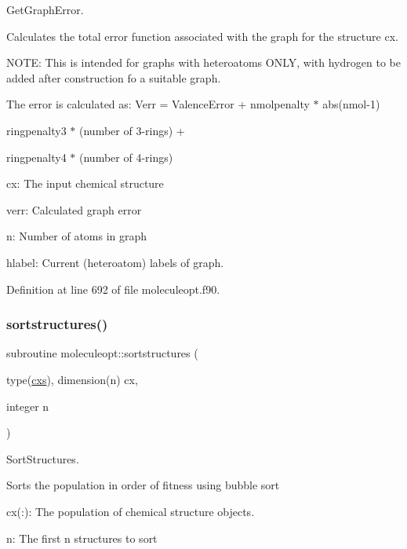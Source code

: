 Get\+Graph\+Error. 

Calculates the total error function associated with the graph for the structure cx.

N\+O\+TE\+: This is intended for graphs with heteroatoms O\+N\+LY, with hydrogen to be added after construction fo a suitable graph.

The error is calculated as\+: Verr = Valence\+Error + nmolpenalty $\ast$ abs(nmol-\/1)
\begin{DoxyItemize}
\item ringpenalty3 $\ast$ (number of 3-\/rings) +
\item ringpenalty4 $\ast$ (number of 4-\/rings)
\end{DoxyItemize}

cx\+: The input chemical structure
\begin{DoxyItemize}
\item verr\+: Calculated graph error
\item n\+: Number of atoms in graph
\item hlabel\+: Current (heteroatom) labels of graph. 
\end{DoxyItemize}

Definition at line 692 of file moleculeopt.\+f90.

\mbox{\label{namespacemoleculeopt_a8cddb40ff4bcb60b423971d0f7547a0a}} 
\subsubsection{\texorpdfstring{sortstructures()}{sortstructures()}}
{\footnotesize\ttfamily subroutine moleculeopt\+::sortstructures (\begin{DoxyParamCaption}\item[{type(\mbox{\hyperlink{structchemstr_1_1cxs}{cxs}}), dimension(n)}]{cx,  }\item[{integer}]{n }\end{DoxyParamCaption})}



Sort\+Structures. 

Sorts the population in order of fitness using bubble sort


\begin{DoxyItemize}
\item cx(\+:)\+: The population of chemical structure objects.
\item n\+: The first n structures to sort 
\end{DoxyItemize}

